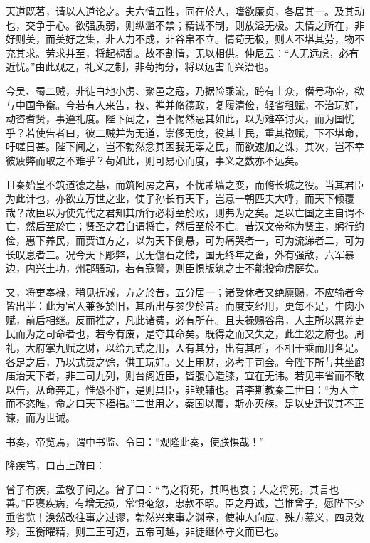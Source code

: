 \documentclass[12pt,UTF8]{ctexbook}
\begin{document}
天道既著，请以人道论之。夫六情五性，同在於人，嗜欲廉贞，各居其一。及其动也，交争于心。欲强质弱，则纵滥不禁；精诚不制，则放溢无极。夫情之所在，非好则美，而美好之集，非人力不成，非谷帛不立。情苟无极，则人不堪其劳，物不充其求。劳求并至，将起祸乱。故不割情，无以相供。仲尼云：“人无远虑，必有近忧。”由此观之，礼义之制，非苟拘分，将以远害而兴治也。

今吴、蜀二贼，非徒白地小虏、聚邑之寇，乃据险乘流，跨有士众，僣号称帝，欲与中国争衡。今若有人来告，权、禅并脩德政，复履清俭，轻省租赋，不治玩好，动咨耆贤，事遵礼度。陛下闻之，岂不惕然恶其如此，以为难卒讨灭，而为国忧乎？若使告者曰，彼二贼并为无道，崇侈无度，役其士民，重其徵赋，下不堪命，吁嗟日甚。陛下闻之，岂不勃然忿其困我无辜之民，而欲速加之诛，其次，岂不幸彼疲弊而取之不难乎？苟如此，则可易心而度，事义之数亦不远矣。

且秦始皇不筑道德之基，而筑阿房之宫，不忧萧墙之变，而脩长城之役。当其君臣为此计也，亦欲立万世之业，使子孙长有天下，岂意一朝匹夫大呼，而天下倾覆哉？故臣以为使先代之君知其所行必将至於败，则弗为之矣。是以亡国之主自谓不亡，然后至於亡；贤圣之君自谓将亡，然后至於不亡。昔汉文帝称为贤主，躬行约俭，惠下养民，而贾谊方之，以为天下倒悬，可为痛哭者一，可为流涕者二，可为长叹息者三。况今天下彫弊，民无儋石之储，国无终年之畜，外有强敌，六军暴边，内兴土功，州郡骚动，若有寇警，则臣惧版筑之士不能投命虏庭矣。

又，将吏奉禄，稍见折减，方之於昔，五分居一；诸受休者又绝廪赐，不应输者今皆出半：此为官入兼多於旧，其所出与参少於昔。而度支经用，更每不足，牛肉小赋，前后相继。反而推之，凡此诸费，必有所在。且夫禄赐谷帛，人主所以惠养吏民而为之司命者也，若今有废，是夺其命矣。既得之而又失之，此生怨之府也。周礼，大府掌九赋之财，以给九式之用，入有其分，出有其所，不相干乘而用各足。各足之后，乃以式贡之馀，供王玩好。又上用财，必考于司会。今陛下所与共坐廊庙治天下者，非三司九列，则台阁近臣，皆腹心造膝，宜在无讳。若见丰省而不敢以告，从命奔走，惟恐不胜，是则具臣，非鲠辅也。昔李斯教秦二世曰：“为人主而不恣睢，命之曰天下桎梏。”二世用之，秦国以覆，斯亦灭族。是以史迁议其不正谏，而为世诫。

书奏，帝览焉，谓中书监、令曰：“观隆此奏，使朕惧哉！”

隆疾笃，口占上疏曰：

曾子有疾，孟敬子问之。曾子曰：“鸟之将死，其鸣也哀；人之将死，其言也善。”臣寝疾病，有增无损，常惧奄忽，忠款不昭。臣之丹诚，岂惟曾子，愿陛下少垂省览！涣然改往事之过谬，勃然兴来事之渊塞，使神人向应，殊方慕义，四灵效珍，玉衡曜精，则三王可迈，五帝可越，非徒继体守文而已也。
\end{document}

